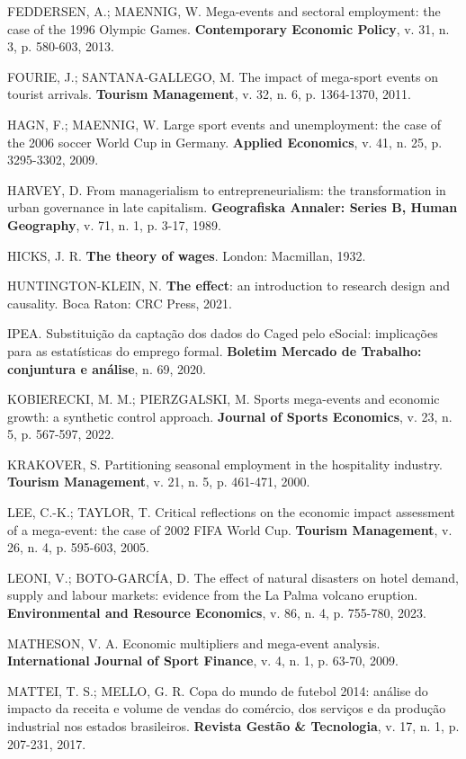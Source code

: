 \begin{singlespace}
FEDDERSEN, A.; MAENNIG, W. Mega-events and sectoral employment: the case of
the 1996 Olympic Games. \textbf{Contemporary Economic Policy}, v. 31, n. 3,
p. 580-603, 2013.

FOURIE, J.; SANTANA-GALLEGO, M. The impact of mega-sport events on tourist arrivals. \textbf{Tourism Management}, v. 32, n. 6, p. 1364-1370, 2011.

HAGN, F.; MAENNIG, W. Large sport events and unemployment: the case of the
2006 soccer World Cup in Germany. \textbf{Applied Economics}, v. 41, n. 25,
p. 3295-3302, 2009.

HARVEY, D. From managerialism to entrepreneurialism: the transformation in
urban governance in late capitalism. \textbf{Geografiska Annaler: Series B,
Human Geography}, v. 71, n. 1, p. 3-17, 1989.

HICKS, J. R. \textbf{The theory of wages}. London: Macmillan, 1932.

HUNTINGTON-KLEIN, N. \textbf{The effect}: an introduction to research design and causality. Boca Raton: CRC Press, 2021.

IPEA. Substituição da captação dos dados do Caged pelo eSocial: implicações
para as estatísticas do emprego formal. \textbf{Boletim Mercado de Trabalho:
conjuntura e análise}, n. 69, 2020.

KOBIERECKI, M. M.; PIERZGALSKI, M. Sports mega-events and economic growth: a
synthetic control approach. \textbf{Journal of Sports Economics}, v. 23,
n. 5, p. 567-597, 2022.

KRAKOVER, S. Partitioning seasonal employment in the hospitality industry. \textbf{Tourism Management}, v. 21, n. 5, p. 461-471, 2000.

LEE, C.-K.; TAYLOR, T. Critical reflections on the economic impact assessment of a mega-event: the case of 2002 FIFA World Cup. \textbf{Tourism Management}, v. 26, n. 4, p. 595-603, 2005.

LEONI, V.; BOTO-GARCÍA, D. The effect of natural disasters on hotel demand, supply and labour markets: evidence from the La Palma volcano eruption. \textbf{Environmental and Resource Economics}, v. 86, n. 4, p. 755-780, 2023.

MATHESON, V. A. Economic multipliers and mega-event analysis.
\textbf{International Journal of Sport Finance}, v. 4, n. 1, p. 63-70, 2009.

MATTEI, T. S.; MELLO, G. R. Copa do mundo de futebol 2014: análise do
impacto da receita e volume de vendas do comércio, dos serviços e da produção
industrial nos estados brasileiros. \textbf{Revista Gestão \& Tecnologia},
v. 17, n. 1, p. 207-231, 2017.


\end{singlespace}
